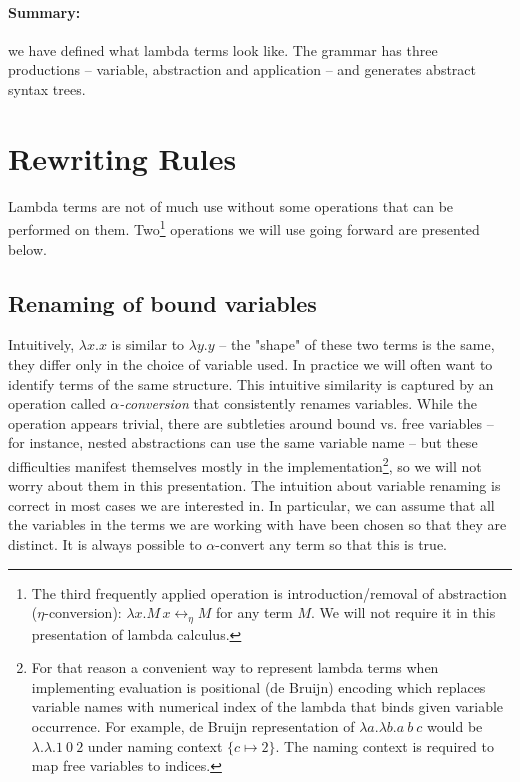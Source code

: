 \documentclass[11pt,twoside,a4paper]{article} %
\begin{document}
\paragraph{Summary:} we have defined what lambda terms look like. The grammar 
has three productions -- variable, abstraction and application -- and generates 
abstract syntax trees.

\section{Rewriting Rules}

Lambda terms are not of much use without some operations that can be performed
on them. Two\footnote{The third frequently applied operation is introduction/removal 
of abstraction ($\eta$-conversion): $\lambda x.M\,x\longleftrightarrow_\eta M$ for 
any term $M$. We will not require it in this presentation of lambda calculus.} 
operations we will use going forward are presented below.

\subsection{Renaming of bound variables}

Intuitively, $\lambda x.x$ is similar to $\lambda y.y$ -- the "shape" of these
two terms is the same, they differ only in the choice of variable used. In 
practice we will often want to identify terms of the same structure. 
This intuitive similarity is captured by an operation called 
\emph{$\alpha$-conversion} that consistently renames variables. While the
operation appears trivial, there are subtleties around bound vs. free
variables -- for instance, nested abstractions can use the same variable name
-- but these difficulties manifest themselves mostly in the
implementation\footnote{For that reason a convenient way to represent 
lambda terms when implementing evaluation is positional (de Bruijn) encoding
which replaces variable names with numerical index of the lambda that binds given 
variable occurrence. For example, de Bruijn representation of 
$\lambda a.\lambda b.a\ b\ c$  would be $\lambda.\lambda.1\ 0\ 2$ under naming 
context $\{c\mapsto 2\}$.  The naming context is required to map free variables 
to indices.}, so we will not worry about them in this presentation. The intuition 
about variable renaming is correct in most cases we are interested in. In 
particular, we can assume that all the variables in the terms we are working 
with have been chosen so that they are distinct. It is always possible to 
$\alpha$-convert any term so that this is true.
\end{document}
